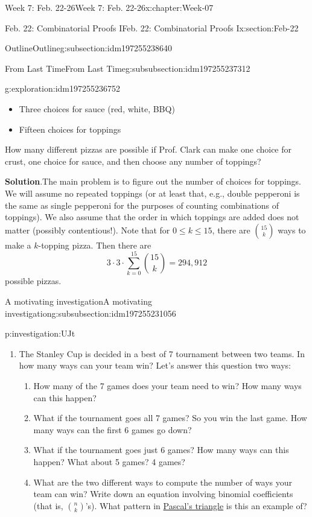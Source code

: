 \documentclass[oneside,10pt,]{book}
\newcommand{\blocktitlefont}{\relax}
\numberwithin{equation}{section}
\renewcommand{\le}{\leqslant}
\begin{document}
\begin{chapterptx}{Week 7: Feb. 22-26}{}{Week 7: Feb. 22-26}{}{}{x:chapter:Week-07}
\begin{sectionptx}{Feb. 22: Combinatorial Proofs I}{}{Feb. 22: Combinatorial Proofs I}{}{}{x:section:Feb-22}
\begin{subsectionptx}{Outline}{}{Outline}{}{}{g:subsection:idm197255238640}
\begin{subsubsectionptx}{From Last Time}{}{From Last Time}{}{}{g:subsubsection:idm197255237312}
\begin{exploration}{}{g:exploration:idm197255236752}
\begin{itemize}[label=\textbullet]
\item{}Three choices for sauce (red, white, BBQ)%
\item{}Fifteen choices for toppings%
\end{itemize}
How many different pizzas are possible if Prof. Clark can make one choice for crust, one choice for sauce, and then choose any number of toppings?%
\par\smallskip%
\noindent\textbf{\blocktitlefont Solution}.\hypertarget{g:solution:idm197255233856}{}\quad{}The main problem is to figure out the number of choices for toppings. We will assume no repeated toppings (or at least that, e.g., double pepperoni is the same as single pepperoni for the purposes of counting combinations of toppings). We also assume that the order in which toppings are added does not matter (possibly contentious!). Note that for \(0 \le k \le 15\), there are \(\binom{15}{k}\) ways to make a \(k\)-topping pizza. Then there are%
\begin{equation*}
3\cdot 3\cdot \sum\limits_{k=0}^{15} \binom{15}{k} = 294,912
\end{equation*}
possible pizzas.%
\end{exploration}%
\end{subsubsectionptx}
%
%
\typeout{************************************************}
\typeout{************************************************}
%
\begin{subsubsectionptx}{A motivating investigation}{}{A motivating investigation}{}{}{g:subsubsection:idm197255231056}
\begin{investigation}{}{p:investigation:UJt}%
%
\begin{enumerate}
\item{}The Stanley Cup is decided in a best of 7 tournament between two teams. In how many ways can your team win? Let's answer this question two ways:%
\begin{enumerate}
\item{}How many of the 7 games does your team need to win? How many ways can this happen?%
\item{}What if the tournament goes all 7 games? So you win the last game. How many ways can the first 6 games go down?%
\item{}What if the tournament goes just 6 games? How many ways can this happen? What about 5 games? 4 games?%
\item{}What are the two different ways to compute the number of ways your team can win? Write down an equation involving binomial coefficients (that is, \({n \choose k}\)'s). What pattern in \hyperref[x:image:pascal-large]{Pascal's triangle} is this an example of?%

\end{enumerate}
\end{enumerate}
\end{investigation}
\end{subsubsectionptx}
\end{subsectionptx}
\end{sectionptx}
\end{chapterptx}
\end{document}
